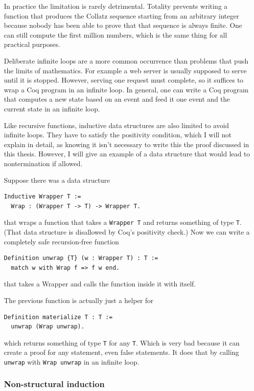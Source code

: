 \documentclass[english, 12pt, a4paper, sci, a-1b, online]{aaltothesis}
\newcommand\icoq[1]{\texttt{#1}}
\begin{document}
In practice the limitation is rarely detrimental. Totality prevents writing a function that produces the Collatz sequence starting from an arbitrary integer because nobody has been able to prove that that sequence is always finite. One can still compute the first million numbers, which is the same thing for all practical purposes.

Deliberate infinite loops are a more common occurrence than problems that push the limits of mathematics. For example a web server is usually supposed to serve until it is stopped. However, serving one request must complete, so it suffices to wrap a Coq program in an infinite loop. In general, one can write a Coq program that computes a new state based on an event and feed it one event and the current state in an infinite loop.

Like recursive functions, inductive data structures are also limited to avoid infinite loops. They have to satisfy the positivity condition, which I will not explain in detail, as knowing it isn't necessary to write this the proof discussed in this thesis. However, I will give an example of a data structure that would lead to nontermination if allowed.

Suppose there was a data structure
\begin{verbatim}
Inductive Wrapper T :=
  Wrap : (Wrapper T -> T) -> Wrapper T.
\end{verbatim}
that wraps a function that takes a \icoq{Wrapper T} and returns something of type \icoq{T}. (That data structure is disallowed by Coq's positivity check.) Now we can write a completely safe recursion-free function
\begin{verbatim}
Definition unwrap {T} (w : Wrapper T) : T :=
  match w with Wrap f => f w end.
\end{verbatim}
that takes a Wrapper and calls the function inside it with itself.

The previous function is actually just a helper for
\begin{verbatim}
Definition materialize T : T :=
  unwrap (Wrap unwrap).
\end{verbatim}
which returns something of type \icoq{T} for any \icoq{T}. Which is very bad because it can create a proof for any statement, even false statements. It does that by calling \icoq{unwrap} with \icoq{Wrap unwrap} in an infinite loop.

\subsubsection{Non-structural induction}
\end{document}
